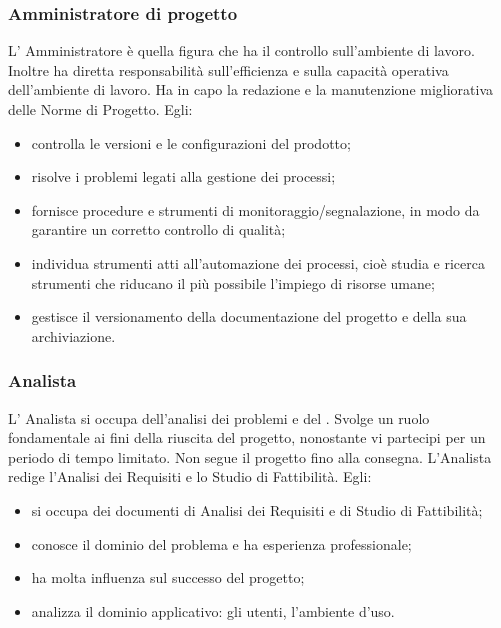 \subsubsection{Amministratore di progetto}
L’ Amministratore è quella figura che ha il controllo sull'ambiente di lavoro. Inoltre ha diretta responsabilità sull'efficienza e sulla capacità operativa dell'ambiente di lavoro.
Ha in capo la redazione e la manutenzione migliorativa delle Norme di Progetto.
Egli:
\begin{itemize}
\item{controlla le versioni e le configurazioni del prodotto;}
\item{risolve i problemi legati alla gestione dei processi;}
\item{fornisce procedure e strumenti di monitoraggio/segnalazione, in modo da garantire un corretto controllo di qualità;}
\item{individua strumenti atti all’automazione dei processi, cioè studia e ricerca strumenti che riducano il più possibile l'impiego di risorse umane;}
\item{gestisce il versionamento della documentazione del progetto e della sua archiviazione.}
\end{itemize}


\subsubsection{Analista}
L’ Analista si occupa dell’analisi dei problemi e del . Svolge un ruolo fondamentale ai fini della riuscita del progetto, nonostante vi partecipi per un periodo di tempo limitato. Non segue il progetto fino alla consegna.
L'Analista redige l'Analisi dei Requisiti e lo Studio di Fattibilità.
Egli:
\begin{itemize}
\item{si occupa dei documenti di Analisi dei Requisiti e di Studio di Fattibilità;}
\item{conosce il dominio del problema e ha esperienza professionale;}
\item{ha molta influenza sul successo del progetto;}
\item{analizza il dominio applicativo:  gli utenti, l’ambiente d’uso.}
\end{itemize}


